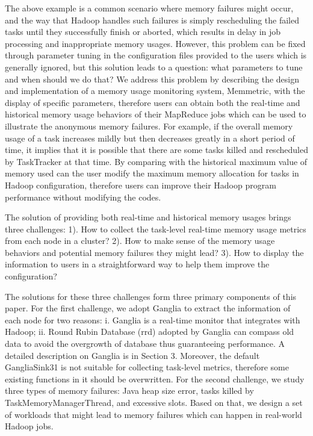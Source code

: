 The above example is a common scenario where memory failures might occur, and the way that Hadoop handles such failures is simply rescheduling the failed tasks until they successfully finish or aborted, which results in delay in job processing and inappropriate memory usages.
However, this problem can be fixed through parameter tuning in the configuration files provided to the users which is generally ignored, but this solution leads to a question: what parameters to tune and when should we do that? 
We address this problem by describing the design and implementation of a memory usage monitoring system, Memmetric, with the display of specific parameters, therefore users can obtain both the real-time and historical memory usage behaviors of their MapReduce jobs which can be used to illustrate the anonymous memory failures.
For example, if the overall memory usage of a task increases mildly but then decreases greatly in a short period of time, it implies that it is possible that there are some tasks killed and rescheduled by TaskTracker at that time.
By comparing with the historical maximum value of memory used can the user modify the maximum memory allocation for tasks in Hadoop configuration, therefore users can improve their Hadoop program performance without modifying the codes.
\par
The solution of providing both real-time and historical memory usages brings three challenges: 1). How to collect the task-level real-time memory usage metrics from each node in a cluster? 2). How to make sense of the memory usage behaviors and potential memory failures they might lead? 3). How to display the information to users in a straightforward way to help them improve the configuration?
\par
The solutions for these three challenges form three primary components of this paper. For the first challenge, we adopt Ganglia to extract the information of each node for two reasons: i. Ganglia is a real-time monitor that integrates with Hadoop; ii. Round Rubin Database (rrd) adopted by Ganglia can compass old data to avoid the overgrowth of database thus guaranteeing performance. A detailed description on Ganglia is in Section 3.
Moreover, the default GangliaSink31 is not suitable for collecting task-level metrics, therefore some existing functions in it should be overwritten.
For the second challenge, we study three types of memory failures: Java heap size error, tasks killed by TaskMemoryManagerThread, and excessive slots.
Based on that, we design a set of workloads that might lead to memory failures which can happen in real-world Hadoop jobs.
